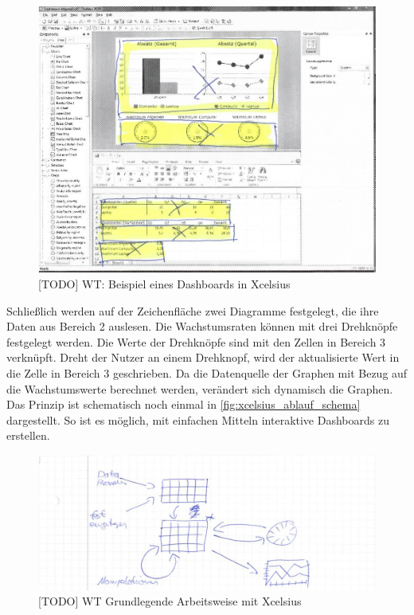 \begin{figure}[h]
\centering
\setlength{\unitlength}{1mm}
\includegraphics[width=15cm]{images/Xcelsius_UI_Beispiel.jpg}
\caption{[TODO] WT: Beispiel eines Dashboards in Xcelsius\label{fig:xcelsius_ui_beispiel}}
\end{figure}

Schließlich werden auf der Zeichenfläche zwei Diagramme festgelegt, die ihre Daten aus Bereich 2 auslesen. Die Wachstumsraten können mit drei Drehknöpfe festgelegt werden. Die Werte der Drehknöpfe sind mit den Zellen in Bereich 3 verknüpft. Dreht der Nutzer an einem Drehknopf, wird der aktualisierte Wert in die Zelle in Bereich 3 geschrieben. Da die Datenquelle der Graphen mit Bezug auf die Wachstumswerte berechnet werden, verändert sich dynamisch die Graphen. Das Prinzip ist schematisch noch einmal in \vref{fig:xcelsius_ablauf_schema} dargestellt. So ist es möglich, mit einfachen Mitteln interaktive Dashboards zu erstellen.

\begin{figure}[h]
\centering
\setlength{\unitlength}{1mm}
\includegraphics[width=15cm]{images/Xcelsius_UI_Ablauf.jpg}
\caption{[TODO] WT Grundlegende Arbeitsweise mit Xcelsius\label{fig:xcelsius_ablauf_schema}}
\end{figure}

